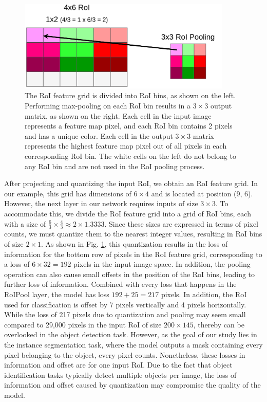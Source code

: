 \begin{figure}[!ht]
    \centering
    \includegraphics[width=4in]{figures/roi_pool_ex.png}
    \caption{The RoI feature grid is divided into RoI bins, as shown on the left. Performing max-pooling on each RoI bin results in a $3 \times 3$ output matrix, as shown on the right. Each cell in the input image represents a feature map pixel, and each RoI bin contains 2 pixels and has a unique color. Each cell in the output $3 \times 3$ matrix represents the highest feature map pixel out of all pixels in each corresponding RoI bin. The white cells on the left do not belong to any RoI bin and are not used in the RoI pooling process.\cite{roi_pooling_problem}}
    \label{fig:roi_pool_ex}
\end{figure}

After projecting and quantizing the input RoI, we obtain an RoI feature grid. In our example, this grid has dimensions of $6 \times 4$ and is located at position (9, 6). However, the next layer in our network requires inputs of size $3 \times 3$. To accommodate this, we divide the RoI feature grid into a grid of RoI bins, each with a size of $\frac{6}{3} \times \frac{4}{3} \approx 2 \times 1.3333$. Since these sizes are expressed in terms of pixel counts, we must quantize them to the nearest integer values, resulting in RoI bins of size $2 \times 1$. As shown in Fig. \ref{fig:roi_pool_ex}, this quantization results in the loss of information for the bottom row of pixels in the RoI feature grid, corresponding to a loss of $6 \times 32 = 192$ pixels in the input image space. In addition, the pooling operation can also cause small offsets in the position of the RoI bins, leading to further loss of information. Combined with every loss that happens in the RoIPool layer, the model has loss $192+25=217$ pixels. In addition, the RoI used for classification is offset by 7 pixels vertically and 4 pixels horizontally. While the loss of 217 pixels due to quantization and pooling may seem small compared to 29,000 pixels in the input RoI of size $200 \times 145$, thereby can be overlooked in the object detection task. However, as the goal of our study lies in the instance segmentation task, where the model outputs a mask containing every pixel belonging to the object, every pixel counts. Nonetheless, these losses in information and offset are for one input RoI. Due to the fact that object identification tasks typically detect multiple objects per image, the loss of information and offset caused by quantization may compromise the quality of the model. 

